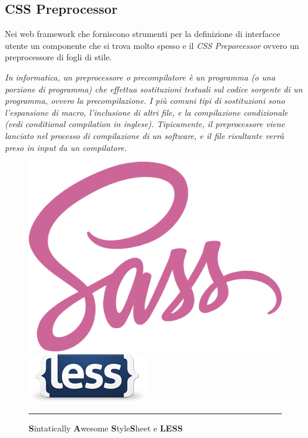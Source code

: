 \subsection{CSS Preprocessor}

Nei web framework che forniscono strumenti per la definizione di interfacce utente un componente che si trova molto spesso e il \emph{CSS Preporcessor} ovvero un preprocessore di fogli di stile.

\emph{In informatica, un preprocessore o precompilatore è un programma (o una porzione di programma) che effettua sostituzioni testuali sul codice sorgente di un programma, ovvero la precompilazione. I più comuni tipi di sostituzioni sono l'espansione di macro, l'inclusione di altri file, e la compilazione condizionale (vedi conditional compilation in inglese). Tipicamente, il preprocessore viene lanciato nel processo di compilazione di un software, e il file risultante verrà preso in input da un compilatore.}
\hspace*{\fill}\cite{wiki:preprocessor} 

\begin{figure}[htbp]
  \centering
    \includegraphics[scale=0.25]{Figures/sass-logo.png} 
    \includegraphics[scale=0.75]{Figures/less-logo.png} 
    \rule{35em}{0.5pt}
  \caption[Css Preprocessors]{\textbf{S}intatically \textbf{A}wesome \textbf{S}tyle\textbf{S}heet e \textbf{LESS}}
  \label{fig:CSS Preprocessors}
\end{figure}


